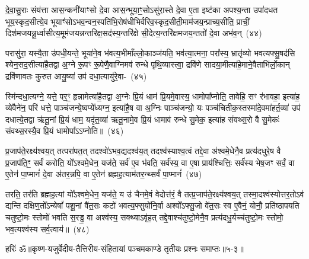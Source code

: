 दे॒वा॒सु॒राः संय॑त्ता आस॒न्कनी॑याꣳसो दे॒वा आस॒न्भूया॒ꣳ॒सो\-ऽसु॑रा॒स्ते दे॒वा ए॒ता इष्ट॑का अपश्य॒न्ता उपा॑दधत भूय॒स्कृद॒सीत्ये॒व भूयाꣳ॑सो\-ऽभव॒न्वन॒स्पति॑भि॒रोष॑धीभिर्वरि\-व॒स्कृद॒सीती॒माम॑\-जय॒न्प्राच्य॒सीति॒ प्राचीं॒ दिश॑मजयन्नू॒र्ध्वासीत्य॒मूम॑जयन्नन्तरिक्ष॒सद॑स्य॒न्तरि॑क्षे सी॒देत्य॒न्तरि॑क्षमजय॒न्ततो॑ दे॒वा अभ॑व॒न्~(४४)\ip

परासु॑रा॒ यस्यै॒ता उ॑पधी॒यन्ते॒ भूया॑ने॒व भ॑वत्य॒भीमाँल्लो॒काञ्ज॑यति॒ भव॑त्या॒त्मना॒ परा᳚स्य॒ भ्रातृ॑व्यो भवत्यफ्सु॒षद॑सि श्येन॒सद॒सीत्या॑है॒तद्वा अ॒ग्ने रू॒पꣳ रू॒पेणै॒वाग्निमव॑ रुन्धे पृथि॒व्यास्त्वा॒ द्रवि॑णे सादया॒मीत्या॑हे॒माने॒वैताभि॑र्लो॒कान् द्रवि॑णावतः कुरुत आयु॒ष्या॑ उप॑ दधा॒त्यायु॑रे॒वा-~(४५)\ip

स्मि॑न्दधा॒त्यग्ने॒ यत्ते॒ पर॒ꣳ॒ हृन्नामेत्या॑है॒तद्वा अ॒ग्नेः प्रि॒यं धाम॑ प्रि॒यमे॒वास्य॒ धामोपा᳚प्नोति॒ तावेहि॒ सꣳ र॑भावहा॒ इत्या॑ह॒ व्ये॑वैने॑न॒ परि॑ धत्ते॒ पाञ्च॑जन्ये॒ष्वप्ये᳚ध्यग्न॒ इत्या॑है॒ष वा अ॒ग्निः पाञ्च॑जन्यो॒ यः पञ्च॑चितीक॒स्तस्मा॑दे॒वमा॑हर्त॒व्या॑ उप॑ दधात्ये॒तद्वा ऋ॑तू॒नां प्रि॒यं धाम॒ यदृ॑त॒व्या॑ ऋतू॒नामे॒व प्रि॒यं धामाव॑ रुन्धे सु॒मेक॒ इत्या॑ह संवथ्स॒रो वै सु॒मेकः॑ संवथ्स॒रस्यै॒व प्रि॒यं धामोपा᳚ऽऽप्नोति॥~(४६)\ip

{\anuvakamend[{अभ॑व॒न्नायु॑रे॒वर्त॒व्या॑ उप॒ षड्विꣳ॑शतिश्च}]}%

प्र॒जा\-प॑ते॒रक्ष्य॑श्वय॒त् तत्परा॑पत॒त् तदश्वो॑\-ऽभव॒द्यदश्व॑य॒त् तदश्व॑स्याश्व॒त्वं तद्दे॒वा अ॑श्वमे॒धेनै॒व प्रत्य॑दधुरे॒ष वै प्र॒जा\-प॑ति॒ꣳ॒ सर्वं॑ करोति॒ यो᳚\-ऽश्वमे॒धेन॒ यज॑ते॒ सर्व॑ ए॒व भ॑वति॒ सर्व॑स्य॒ वा ए॒षा प्राय॑श्चित्तिः॒ सर्व॑स्य भेष॒जꣳ सर्वं॒ वा ए॒तेन॑ पा॒प्मानं॑ दे॒वा अ॑तर॒न्नपि॒ वा ए॒तेन॑ ब्रह्मह॒त्याम॑तर॒न्थ्सर्वं॑ पा॒प्मानं॑~(४७)\ip

तरति॒ तर॑ति ब्रह्मह॒त्यां यो᳚\-ऽश्वमे॒धेन॒ यज॑ते॒ य उ॑ चैनमे॒वं वेदोत्त॑रं॒ वै तत्प्र॒जा\-प॑ते॒रक्ष्य॑श्वय॒त् तस्मा॒दश्व॑स्योत्तर॒तो\-ऽव॑ द्यन्ति दक्षिण॒तो᳚\-ऽन्येषां᳚ पशू॒नां वै॑त॒सः कटो॑ भवत्य॒फ्सुयो॑नि॒र्वा अश्वो᳚\-ऽफ्सु॒जो वे॑त॒सः स्व ए॒वैनं॒ योनौ॒ प्रति॑\-ष्ठापयति चतुष्टो॒मः स्तोमो॑ भवति स॒रड्ढ॒ वा अश्व॑स्य॒ सक्थ्या\-ऽवृ॑ह॒त् तद्दे॒वाश्च॑तुष्टो॒मेनै॒व प्रत्य॑दधु॒र्यच्च॑तुष्टो॒मः स्तोमो॒ भव॒त्यश्व॑स्य सर्व॒त्वाय॑॥~(४८)\ip

{\anuvakamend[{सर्वं॑ पा॒प्मान॑मवृह॒द्द्वाद॑श च}]}%

{हरिः॑ ॐ}{॥कृष्ण-यजुर्वेदीय-तैत्तिरीय-संहितायां पञ्चमकाण्डे तृतीयः प्रश्नः समाप्तः॥५-३॥}


